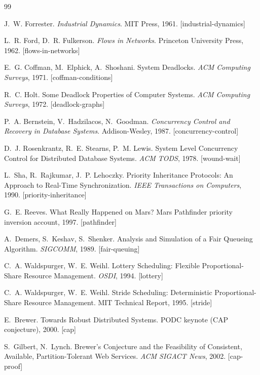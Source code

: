 \documentclass[11pt]{article}
\begin{document}
\begin{thebibliography}{99}

 J.~W. Forrester. \emph{Industrial
Dynamics}. MIT Press, 1961. [industrial-dynamics]

 L.~R. Ford, D.~R. Fulkerson. \emph{Flows in
Networks}. Princeton University Press, 1962. [flows-in-networks]

 E.~G. Coffman, M.~Elphick, A.~Shoshani.
System Deadlocks. \emph{ACM Computing Surveys}, 1971.
[coffman-conditions]

 R.~C. Holt. Some Deadlock Properties of
Computer Systems. \emph{ACM Computing Surveys}, 1972. [deadlock-graphs]

 P.~A. Bernstein, V.~Hadzilacos,
N.~Goodman. \emph{Concurrency Control and Recovery in Database
Systems}. Addison-Wesley, 1987. [concurrency-control]

 D.~J. Rosenkrantz, R.~E. Stearns, P.~M. Lewis.
System Level Concurrency Control for Distributed Database Systems.
\emph{ACM TODS}, 1978. [wound-wait]

 L.~Sha, R.~Rajkumar, J.~P. Lehoczky.
Priority Inheritance Protocols: An Approach to Real-Time
Synchronization. \emph{IEEE Transactions on Computers}, 1990.
[priority-inheritance]

 G.~E. Reeves. What Really Happened on Mars?
Mars Pathfinder priority inversion account, 1997. [pathfinder]

 A.~Demers, S.~Keshav, S.~Shenker. Analysis and
Simulation of a Fair Queueing Algorithm. \emph{SIGCOMM}, 1989.
[fair-queuing]

 C.~A. Waldspurger, W.~E. Weihl. Lottery Scheduling:
Flexible Proportional-Share Resource Management. \emph{OSDI}, 1994.
[lottery]

 C.~A. Waldspurger, W.~E. Weihl. Stride Scheduling:
Deterministic Proportional-Share Resource Management. MIT Technical
Report, 1995. [stride]

 E.~Brewer. Towards Robust Distributed Systems. PODC
keynote (CAP conjecture), 2000. [cap]

 S.~Gilbert, N.~Lynch. Brewer's Conjecture and the
Feasibility of Consistent, Available, Partition-Tolerant Web Services.
\emph{ACM SIGACT News}, 2002. [cap-proof]


\end{thebibliography}
\end{document}
